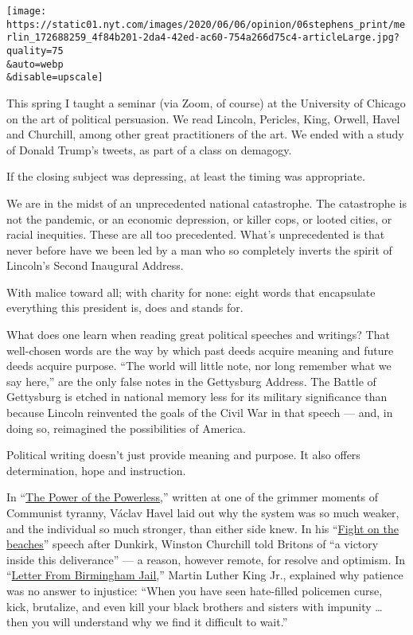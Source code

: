 \texttt{[image: https://static01.nyt.com/images/2020/06/06/opinion/06stephens\_print/merlin\_172688259\_4f84b201-2da4-42ed-ac60-754a266d75c4-articleLarge.jpg?quality=75\\\&auto=webp\\\&disable=upscale]}

This spring I taught a seminar (via Zoom, of course) at the University
of Chicago on the art of political persuasion. We read Lincoln,
Pericles, King, Orwell, Havel and Churchill, among other great
practitioners of the art. We ended with a study of Donald Trump's
tweets, as part of a class on demagogy.

If the closing subject was depressing, at least the timing was
appropriate.

We are in the midst of an unprecedented national catastrophe. The
catastrophe is not the pandemic, or an economic depression, or killer
cops, or looted cities, or racial inequities. These are all too
precedented. What's unprecedented is that never before have we been led
by a man who so completely inverts the spirit of Lincoln's Second
Inaugural Address.

With malice toward all; with charity for none: eight words that
encapsulate everything this president is, does and stands for.

What does one learn when reading great political speeches and writings?
That well-chosen words are the way by which past deeds acquire meaning
and future deeds acquire purpose. ``The world will little note, nor long
remember what we say here,'' are the only false notes in the Gettysburg
Address. The Battle of Gettysburg is etched in national memory less for
its military significance than because Lincoln reinvented the goals of
the Civil War in that speech --- and, in doing so, reimagined the
possibilities of America.

Political writing doesn't just provide meaning and purpose. It also
offers determination, hope and instruction.

In
``\href{https://hac.bard.edu/amor-mundi/the-power-of-the-powerless-vaclav-havel-2011-12-23}{The
Power of the Powerless},'' written at one of the grimmer moments of
Communist tyranny, Václav Havel laid out why the system was so much
weaker, and the individual so much stronger, than either side knew. In
his
``\href{https://winstonchurchill.org/resources/speeches/1940-the-finest-hour/we-shall-fight-on-the-beaches/}{Fight
on the beaches}'' speech after Dunkirk, Winston Churchill told Britons
of ``a victory inside this deliverance'' --- a reason, however remote,
for resolve and optimism. In
``\href{https://www.africa.upenn.edu/Articles_Gen/Letter_Birmingham.html}{Letter
From Birmingham Jail},'' Martin Luther King Jr., explained why patience
was no answer to injustice: ``When you have seen hate-filled policemen
curse, kick, brutalize, and even kill your black brothers and sisters
with impunity \ldots{} then you will understand why we find it difficult
to wait.''


